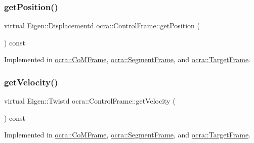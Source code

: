 \hypertarget{classocra_1_1ControlFrame_aaadbbfbcdd5b8e197a0f181ffb2fdcbe}{}\label{classocra_1_1ControlFrame_aaadbbfbcdd5b8e197a0f181ffb2fdcbe} 
\subsubsection{\texorpdfstring{get\+Position()}{getPosition()}}
{\footnotesize\ttfamily virtual Eigen\+::\+Displacementd ocra\+::\+Control\+Frame\+::get\+Position (\begin{DoxyParamCaption}{ }\end{DoxyParamCaption}) const\hspace{0.3cm}{\ttfamily [pure virtual]}}



Implemented in \hyperlink{classocra_1_1CoMFrame_a809c05664b2e2abb489e930e27fbe2d4}{ocra\+::\+Co\+M\+Frame}, \hyperlink{classocra_1_1SegmentFrame_ad0c5aa3b15b384cd5a4774ddd534b32e}{ocra\+::\+Segment\+Frame}, and \hyperlink{classocra_1_1TargetFrame_ab2f3bd3f05be243a5d9e2123b943986d}{ocra\+::\+Target\+Frame}.

\hypertarget{classocra_1_1ControlFrame_a398df839f75886867c86a8e70ac9bf24}{}\label{classocra_1_1ControlFrame_a398df839f75886867c86a8e70ac9bf24} 
\subsubsection{\texorpdfstring{get\+Velocity()}{getVelocity()}}
{\footnotesize\ttfamily virtual Eigen\+::\+Twistd ocra\+::\+Control\+Frame\+::get\+Velocity (\begin{DoxyParamCaption}{ }\end{DoxyParamCaption}) const\hspace{0.3cm}{\ttfamily [pure virtual]}}



Implemented in \hyperlink{classocra_1_1CoMFrame_a02be3e73c64903d67b1e7ada25c468c5}{ocra\+::\+Co\+M\+Frame}, \hyperlink{classocra_1_1SegmentFrame_a6a45d4901408704ead9bbd1f5b99a666}{ocra\+::\+Segment\+Frame}, and \hyperlink{classocra_1_1TargetFrame_a5eeda88210d7002c3c73ba949139ed5b}{ocra\+::\+Target\+Frame}.

\hypertarget{classocra_1_1ControlFrame_a069aaf1eab98598fbffee263fcde0c56}{}\label{classocra_1_1ControlFrame_a069aaf1eab98598fbffee263fcde0c56} 
